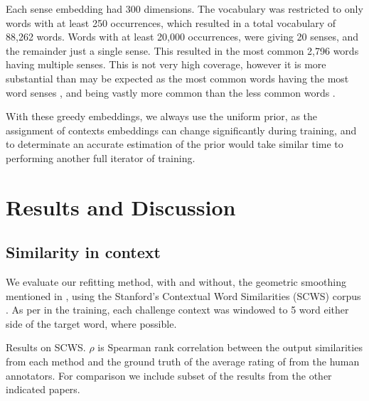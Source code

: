 \documentclass{sig-alternate}
\begin{document}
Each sense embedding had 300 dimensions.
The vocabulary was restricted to only words with at least 250 occurrences, which resulted in a total vocabulary of 88,262 words. Words with at least 20,000 occurrences, were giving 20 senses, and the remainder just a single sense. This resulted in the most common 2,796 words having multiple senses. This is not very high coverage, however it is more substantial than may be expected as the most common words having the most word senses \parencite{zipf1945meaning}, and being vastly more common than the less common words \parencite{zipf1949human,gilmour2005understanding}.

With these greedy embeddings, we always use the uniform prior, as the assignment of contexts embeddings can change significantly during training, and to determinate an accurate estimation of the prior would take similar time to performing another full iterator of training.


\section{Results and Discussion} \label{results}


\subsection{Similarity in context}

We evaluate our refitting method, with and without, the geometric smoothing mentioned in , using the Stanford's Contextual Word Similarities (SCWS) corpus \parencite{Huang2012}.
As per in the training, each challenge context was windowed to 5 word either side of the target word, where possible.

\begin{table*}

\caption{Results on SCWS. $\rho$ is Spearman rank correlation between the output similarities from each method and the ground truth of the average rating of from the human annotators. For comparison we include subset of the results from the other indicated papers. } \label{swscres}
\end{table*}
\end{document}
